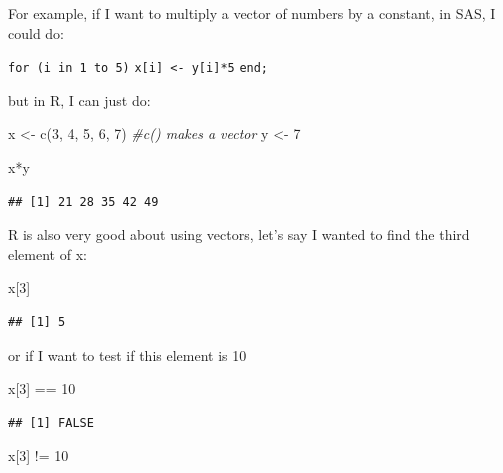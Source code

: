 \documentclass[
]{book}
\newenvironment{Shaded}{\begin{snugshade}}{\end{snugshade}}
\newcommand{\CommentTok}[1]{\textcolor[rgb]{0.56,0.35,0.01}{\textit{#1}}}
\newcommand{\DecValTok}[1]{\textcolor[rgb]{0.00,0.00,0.81}{#1}}
\newcommand{\FunctionTok}[1]{\textcolor[rgb]{0.00,0.00,0.00}{#1}}
\newcommand{\NormalTok}[1]{#1}
\newcommand{\OtherTok}[1]{\textcolor[rgb]{0.56,0.35,0.01}{#1}}
\newcommand{\SpecialCharTok}[1]{\textcolor[rgb]{0.00,0.00,0.00}{#1}}
\begin{document}
For example, if I want to multiply a vector of numbers by a constant, in
SAS, I could do:

\texttt{for\ (i\ in\ 1\ to\ 5)} \texttt{x{[}i{]}\ \textless{}-\ y{[}i{]}*5} \texttt{end;}

but in R, I can just do:

\begin{Shaded}
\begin{Highlighting}[]
\NormalTok{x }\OtherTok{\textless{}{-}} \FunctionTok{c}\NormalTok{(}\DecValTok{3}\NormalTok{, }\DecValTok{4}\NormalTok{, }\DecValTok{5}\NormalTok{, }\DecValTok{6}\NormalTok{, }\DecValTok{7}\NormalTok{)}
\CommentTok{\#c() makes a vector}
\NormalTok{y }\OtherTok{\textless{}{-}} \DecValTok{7}

\NormalTok{x}\SpecialCharTok{*}\NormalTok{y}
\end{Highlighting}
\end{Shaded}

\begin{verbatim}
## [1] 21 28 35 42 49
\end{verbatim}

R is also very good about using vectors, let's say I wanted to find the
third element of x:

\begin{Shaded}
\begin{Highlighting}[]
\NormalTok{x[}\DecValTok{3}\NormalTok{]}
\end{Highlighting}
\end{Shaded}

\begin{verbatim}
## [1] 5
\end{verbatim}

or if I want to test if this element is 10

\begin{Shaded}
\begin{Highlighting}[]
\NormalTok{x[}\DecValTok{3}\NormalTok{] }\SpecialCharTok{==} \DecValTok{10}
\end{Highlighting}
\end{Shaded}

\begin{verbatim}
## [1] FALSE
\end{verbatim}

\begin{Shaded}
\begin{Highlighting}[]
\NormalTok{x[}\DecValTok{3}\NormalTok{] }\SpecialCharTok{!=} \DecValTok{10}
\end{Highlighting}
\end{Shaded}
\end{document}
